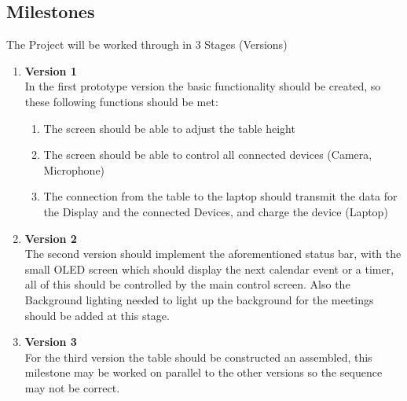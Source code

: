 \subsection{Milestones}
The Project will be worked through in 3 Stages (Versions)
\begin{enumerate}
	\item \textbf{Version 1}\\
	In the first prototype version the basic functionality should be created, so these following functions should be met: 
	\begin{enumerate}
		\item The screen should be able to adjust the table height
		\item The screen should be able to control all connected devices (Camera, Microphone)
		\item The connection from the table to the laptop should transmit the data for the Display and the connected Devices, and charge the device (Laptop)
	\end{enumerate}
	\item \textbf{Version 2}\\
	The second version should implement the aforementioned status bar, with the small OLED screen which should display the next calendar event or a timer, all of this should be controlled by the main control screen.
	Also the Background lighting needed to light up the background for the meetings should be added at this stage. 
	\pagebreak
	 
	\item \textbf{Version 3}\\
	For the third version the table should be constructed an assembled, this milestone may be worked on parallel to the other versions so the sequence may not be correct. 
\end{enumerate}